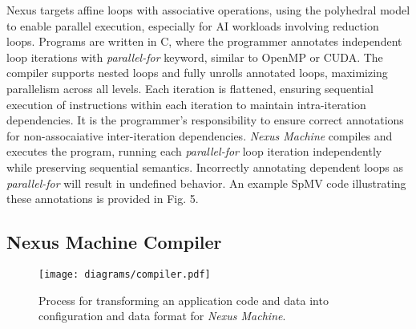 {Nexus targets affine loops with associative operations, using the polyhedral model to enable parallel execution, especially for AI workloads involving reduction loops. Programs are written in C, where the programmer annotates independent loop iterations with \textit{parallel-for} keyword, similar to OpenMP or CUDA. The compiler supports nested loops and fully unrolls annotated loops, maximizing parallelism across all levels. Each iteration is flattened, ensuring sequential execution of instructions within each iteration to maintain intra-iteration dependencies. It is the programmer’s responsibility to ensure correct annotations for non-assocaiative inter-iteration dependencies. \textit{Nexus Machine} compiles and executes the program, running each \textit{parallel-for} loop iteration independently while preserving sequential semantics. Incorrectly annotating dependent loops as \textit{parallel-for} will result in undefined behavior. An example SpMV code illustrating these annotations is provided in Fig. 5.
\vspace{-0.39cm}
\subsection{Nexus Machine Compiler}
\label{section:compiler}
\begin{figure}[h!]
	\scriptsize
	\centering
	\texttt{[image: diagrams/compiler.pdf]}
	\caption{Process for transforming an application code and data into configuration and data format for \textit{Nexus Machine}.}
	\label{fig:compiler}
\end{figure}

\begin{comment}
\begin{algorithm}[!t]
\small
\caption{DFG generation}
\label{alg:labelAwareSA}
Identify backedges and connect basic blocks \;
Get transfer variables among nested loops \;
Convert LLVM IR instruction into DFG nodes \;
Set data dependency constraints \;
Remove redundant and dead DFG nodes \;
Sort DFG nodes by ASAP order \;
\KwIn{Source code, annotated loop;}
\KwOut{DFG}
\end{algorithm}
\end{comment}

}
